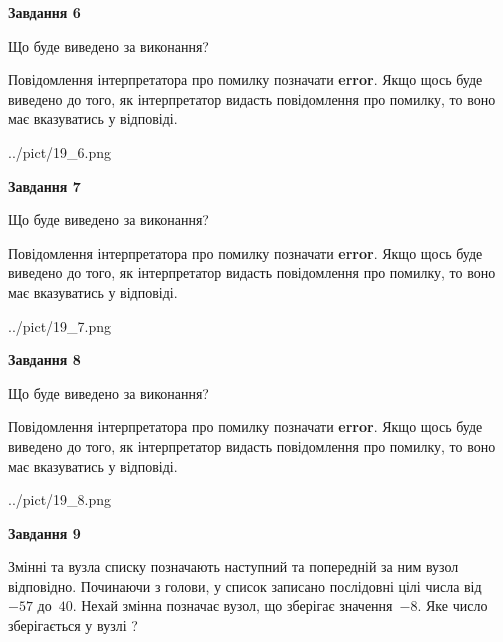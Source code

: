 \documentclass[12pt, ukrainian]{article}
\begin{document}
{\begin {large}
{\begin {center}\textbf{Завдання 6}\end {center}}\par
Що буде виведено за виконання?

Повідомлення інтерпретатора про помилку позначати \textbf{error}.
Якщо щось буде виведено до того, як інтерпретатор видасть повідомлення про помилку, 
то воно має вказуватись у відповіді. \par


\begin{center}
	{../pict/19_6.png}
\end{center}
\newpage

{\begin {center}\textbf{Завдання 7}\end {center}}\par
Що буде виведено за виконання?

Повідомлення інтерпретатора про помилку позначати \textbf{error}.
Якщо щось буде виведено до того, як інтерпретатор видасть повідомлення про помилку, 
то воно має вказуватись у відповіді. \par


\begin{center}
	{../pict/19_7.png}
\end{center}
\newpage

{\begin {center}\textbf{Завдання 8}\end {center}}\par
Що буде виведено за виконання?

Повідомлення інтерпретатора про помилку позначати \textbf{error}.
Якщо щось буде виведено до того, як інтерпретатор видасть повідомлення про помилку, 
то воно має вказуватись у відповіді. \par


\begin{center}
	{../pict/19_8.png}
\end{center}
\newpage

{\begin {center}\textbf{Завдання 9}\end {center}}\par
Змінні  та  вузла списку позначають наступний та попередній за ним вузол відповідно. Починаючи з голови, у список записано послідовні цілі числа від~$-57$ до~$40$. Нехай змінна  позначає вузол, що зберігає значення~$-8$.
Яке число зберігається у вузлі  ?\par
\newpage


\end{large}}
\end{document}
